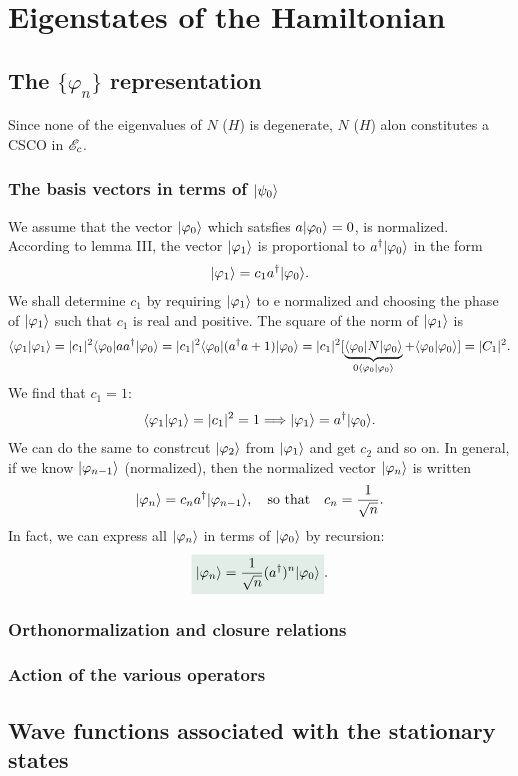 \section{Eigenstates of the Hamiltonian}

%
\subsection{The $\{\varphi_n\}$ representation}
Since none of the eigenvalues of $N$ ($H$) is degenerate, $N$ ($H$) alon constitutes a CSCO in $\mathscr{E}_c$.
%
\subsubsection{The basis vectors in terms of $|\psi_0\rangle$}
We assume that the vector $|\varphi_0\rangle$ which satsfies $a|\varphi_0\rangle=0$, is normalized. According to lemma III, the vector $|\varphi_1\rangle$ is proportional 
to $a^\dagger|\varphi_0\rangle$ in the form 
\begin{align*}
    |\varphi_1\rangle=c_1a^\dagger|\varphi_0\rangle.
\end{align*} 
We shall determine $c_1$ by requiring $|\varphi_1\rangle$ to e normalized and choosing the phase of $|\varphi_1\rangle$ such that $c_1$ is real and positive.
The square of the norm of $|\varphi_1\rangle$ is 
\begin{align*}
    \langle\varphi_1|\varphi_1\rangle=|c_1|^2\langle\varphi_0|aa^\dagger|\varphi_0\rangle=|c_1|^2\langle\varphi_0|(a^\dagger a+1)|\varphi_0\rangle=|c_1|^2[\underbrace{\langle\varphi_0|N|\varphi_0\rangle}_{0\langle\varphi_0|\varphi_0\rangle}+\langle\varphi_0|\varphi_0\rangle]=|C_1|^2.
\end{align*}
We find that $c_1=1$:
\begin{align}
    \langle\varphi_1|\varphi_1\rangle=|c_1|^2=1\Longrightarrow |\varphi_1\rangle=a^\dagger|\varphi_0\rangle.
\end{align}
We can do the same to constrcut $|\varphi_2\rangle$ from $|\varphi_1\rangle$ and get $c_2$ and so on. In general, if we know $|\varphi_{n-1}\rangle$ (normalized), then the 
normalized vector $|\varphi_n\rangle$ is written 
\begin{align*}
    |\varphi_n\rangle=c_na^\dagger|\varphi_{n-1}\rangle,\quad\text{so that}\quad c_n=\frac{1}{\sqrt{n}}.
\end{align*}
In fact, we can express all $|\varphi_n\rangle$ in terms of $|\varphi_0\rangle$ by recursion:
\begin{align}
    \highlight{\ket{\varphi_n}=\frac{1}{\sqrt{n}}(a^\dagger)^n\ket{\varphi_0}}.
\end{align}
%
\subsubsection{Orthonormalization and closure relations}
%
\subsubsection{Action of the various operators}

%
\subsection{Wave functions associated with the stationary states}



